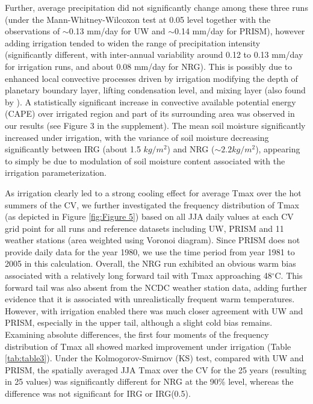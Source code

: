 \documentclass[draft,ms]{agutex}   %
\begin{document}
\begin{article}
Further, average precipitation did not significantly change among these three runs (under the Mann-Whitney-Wilcoxon test at 0.05 level together with the observations of $\sim$0.13 mm/day for UW and $\sim$0.14 mm/day for PRISM), however adding irrigation tended to widen the range of precipitation intensity (significantly different, with inter-annual variability around 0.12 to 0.13 mm/day for irrigation runs, and about 0.08 mm/day for NRG). This is possibly due to enhanced local convective processes driven by irrigation modifying the depth of planetary boundary layer, lifting condensation level, and mixing layer (also found by \cite{kawase2008impact, deangelis2010evidence, qian2013modeling}).  A statistically significant increase in convective available potential energy (CAPE) over irrigated region and part of its surrounding area was observed in our results (see Figure 3 in the supplement). The mean soil moisture significantly increased under irrigation, with the variance of soil moisture decreasing significantly between IRG (about 1.5 $kg/m^2$) and NRG ($\sim2.2 kg/m^2$), appearing to simply be due to modulation of soil moisture content associated with the irrigation parameterization.

As irrigation clearly led to a strong cooling effect for average Tmax over the hot summers of the CV, we further investigated the frequency distribution of Tmax (as depicted in Figure \ref{fig:Figure 5}) based on all JJA daily values at each CV grid point for all runs and reference datasets including UW, PRISM and 11 weather stations (area weighted using Voronoi diagram). Since PRISM does not provide daily data for the year 1980, we use the time period from year 1981 to 2005 in this calculation. Overall, the NRG run exhibited an obvious warm bias associated with a relatively long forward tail with Tmax approaching 48$^\circ$C.  This forward tail was also absent from the NCDC weather station data, adding further evidence that it is associated with unrealistically frequent warm temperatures. However, with irrigation enabled there was much closer agreement with UW and PRISM, especially in the upper tail, although a slight cold bias remains. Examining absolute differences, the first four moments of the frequency distribution of Tmax all showed marked improvement under irrigation (Table \ref{tab:table3}). Under the Kolmogorov-Smirnov (KS) test, compared with UW and PRISM, the spatially averaged JJA Tmax over the CV for the 25 years (resulting in 25 values) was significantly different for NRG at the 90\% level, whereas the difference was not significant for IRG or IRG(0.5).


\end{article}
\end{document}
